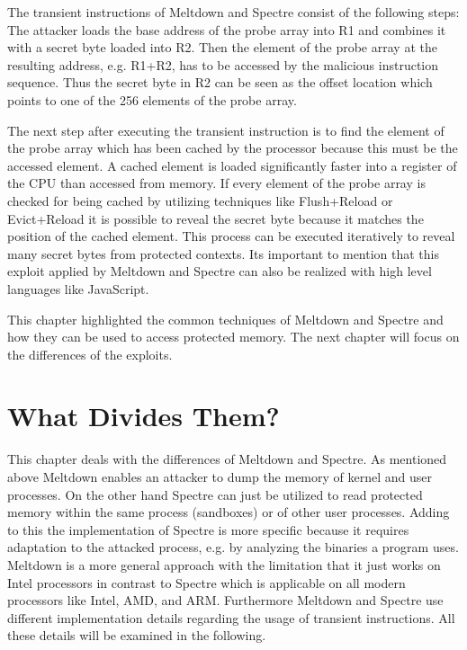 \documentclass[a4paper,oneside,openright] {scrreprt}
\begin{document}
The transient instructions of Meltdown and Spectre consist of the following steps:
The attacker loads the base address of the probe array into R1 and combines it with a secret byte loaded into R2. 
Then the element of the probe array at the resulting address, e.g. R1+R2, has to be accessed by the malicious instruction sequence.
Thus the secret byte in R2 can be seen as the offset location which points to one of the 256 elements of the probe array.

The next step after executing the transient instruction is to find the element of the probe array which has been cached by the processor
because this must be the accessed element.
A cached element is loaded significantly faster into a register of the CPU than accessed from memory.
If every element of the probe array is checked for being cached by utilizing techniques like Flush+Reload or Evict+Reload it is possible
to reveal the secret byte because it matches the position of the cached element.
This process can be executed iteratively to reveal many secret bytes from protected contexts. Its important to mention that this exploit
applied by Meltdown and Spectre can also be realized with high level languages like JavaScript.

This chapter highlighted the common techniques of Meltdown and Spectre and how they can be used to access protected memory.
The next chapter will focus on the differences of the exploits.

\section{What Divides Them?}
\label{ch:intro:motivation}

This chapter deals with the differences of Meltdown and Spectre. As mentioned above Meltdown enables an attacker 
to dump the memory of kernel and user processes. On the other hand Spectre can just be utilized to read protected memory within 
the same process (sandboxes) or of other user processes.
Adding to this the implementation of Spectre is more specific because it requires adaptation to the attacked process,
 e.g. by analyzing the binaries a program uses. Meltdown is a more general approach with the limitation that it just works on Intel
 processors in contrast to Spectre which is applicable on all modern processors like Intel, AMD, and ARM. Furthermore Meltdown and 
 Spectre use different implementation details regarding the usage of transient instructions. 
 All these details will be examined in the following.
\end{document}
